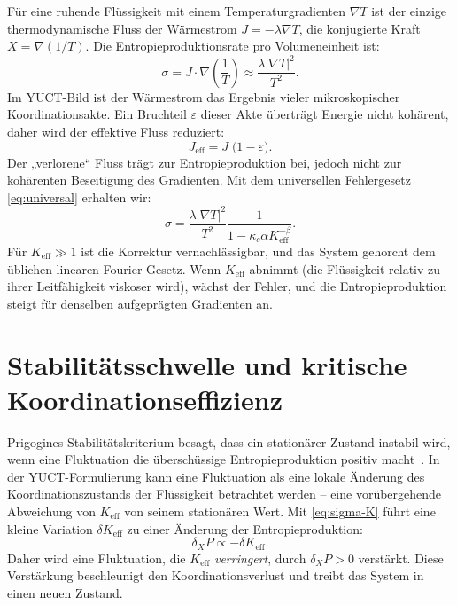 \documentclass[12pt,a4paper]{article}
\begin{document}
	Für eine ruhende Flüssigkeit mit einem Temperaturgradienten \(\nabla T\) ist der einzige thermodynamische Fluss der Wärmestrom \(J = -\lambda \nabla T\), die konjugierte Kraft \(X = \nabla(1/T)\). Die Entropieproduktionsrate pro Volumeneinheit ist:
	\begin{equation}\label{eq:sigma}
		\sigma = J \cdot \nabla\left(\frac{1}{T}\right) \approx \frac{\lambda |\nabla T|^2}{T^2}.
	\end{equation}
	Im YUCT-Bild ist der Wärmestrom das Ergebnis vieler mikroskopischer Koordinationsakte. Ein Bruchteil \(\varepsilon\) dieser Akte überträgt Energie nicht kohärent, daher wird der effektive Fluss reduziert:
	\begin{equation}\label{eq:J-effective}
		J_{\mathrm{eff}} = J \; \bigl(1 - \varepsilon\bigr).
	\end{equation}
	Der „verlorene“ Fluss trägt zur Entropieproduktion bei, jedoch nicht zur kohärenten Beseitigung des Gradienten. Mit dem universellen Fehlergesetz \eqref{eq:universal} erhalten wir:
	\begin{equation}\label{eq:sigma-K}
		\sigma = \frac{\lambda |\nabla T|^2}{T^2} \frac{1}{1 - \kappa_c\alpha K_{\mathrm{eff}}^{-\beta}}.
	\end{equation}
	Für \(K_{\mathrm{eff}} \gg 1\) ist die Korrektur vernachlässigbar, und das System gehorcht dem üblichen linearen Fourier-Gesetz. Wenn \(K_{\mathrm{eff}}\) abnimmt (die Flüssigkeit relativ zu ihrer Leitfähigkeit viskoser wird), wächst der Fehler, und die Entropieproduktion steigt für denselben aufgeprägten Gradienten an.
	
	\section{Stabilitätsschwelle und kritische Koordinationseffizienz}
	
	Prigogines Stabilitätskriterium besagt, dass ein stationärer Zustand instabil wird, wenn eine Fluktuation die überschüssige Entropieproduktion positiv macht~\cite{Glansdorff1971}. In der YUCT-Formulierung kann eine Fluktuation als eine lokale Änderung des Koordinationszustands der Flüssigkeit betrachtet werden – eine vorübergehende Abweichung von \(K_{\mathrm{eff}}\) von seinem stationären Wert. Mit \eqref{eq:sigma-K} führt eine kleine Variation \(\delta K_{\mathrm{eff}}\) zu einer Änderung der Entropieproduktion:
	\begin{equation}
		\delta_X P \propto - \delta K_{\mathrm{eff}}.
	\end{equation}
	Daher wird eine Fluktuation, die \(K_{\mathrm{eff}}\) \emph{verringert}, durch \(\delta_X P > 0\) verstärkt. Diese Verstärkung beschleunigt den Koordinationsverlust und treibt das System in einen neuen Zustand.
	
\end{document}
